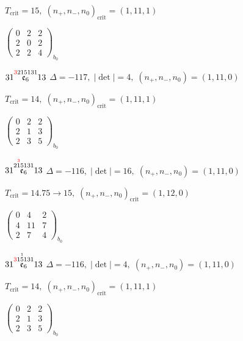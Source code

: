 \documentclass[10pt]{article}
\begin{document}
\hspace{1em}$T_{\text{crit}}=15,\; (n_+,n_-,n_0)_{\text{crit}}=(1,11,1)$

\hspace{2em}$\left(\begin{smallmatrix}0 & 2 & 2 \\ 2 & 0 & 2 \\ 2 & 2 & 4\end{smallmatrix}\right)_{\!b_0}$

\smallskip

$31\overset{\textcolor{red}{3}215131}{\mathfrak{e}_6}13$ \quad $\Delta=-117,\; |\det|=4,\; (n_+,n_-,n_0)=(1,11,0)$

\hspace{1em}$T_{\text{crit}}=14,\; (n_+,n_-,n_0)_{\text{crit}}=(1,11,1)$

\hspace{2em}$\left(\begin{smallmatrix}0 & 2 & 2 \\ 2 & 1 & 3 \\ 2 & 3 & 5\end{smallmatrix}\right)_{\!b_0}$

$31\overset{2\overset{\textcolor{red}{3}}{1}5131}{\mathfrak{e}_6}13$ \quad $\Delta=-116,\; |\det|=16,\; (n_+,n_-,n_0)=(1,11,0)$

\hspace{1em}$T_{\text{crit}}=14.75 \to 15,\; (n_+,n_-,n_0)_{\text{crit}}=(1,12,0)$

\hspace{2em}$\left(\begin{smallmatrix}0 & 4 & 2 \\ 4 & 11 & 7 \\ 2 & 7 & 4\end{smallmatrix}\right)_{\!b_0}$

\smallskip

$31\overset{\textcolor{red}{3}1\overset{1}{5}131}{\mathfrak{e}_6}13$ \quad $\Delta=-116,\; |\det|=4,\; (n_+,n_-,n_0)=(1,11,0)$

\hspace{1em}$T_{\text{crit}}=14,\; (n_+,n_-,n_0)_{\text{crit}}=(1,11,1)$

\hspace{2em}$\left(\begin{smallmatrix}0 & 2 & 2 \\ 2 & 1 & 3 \\ 2 & 3 & 5\end{smallmatrix}\right)_{\!b_0}$
\end{document}
